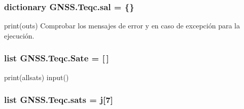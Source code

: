 \subsubsection[{sal}]{\setlength{\rightskip}{0pt plus 5cm}dictionary G\-N\-S\-S.\-Teqc.\-sal = \{\}}\label{namespaceGNSS_1_1Teqc_a0b9c69b0e28e6b6908f862f705cd1ad6}


print(outs) Comprobar los mensajes de error y en caso de excepción para la ejecución. 

\subsubsection[{Sate}]{\setlength{\rightskip}{0pt plus 5cm}list G\-N\-S\-S.\-Teqc.\-Sate = [$\,$]}\label{namespaceGNSS_1_1Teqc_a0bade0c6e842780cce100a78e33aa22f}


print(allsats) input() 

\subsubsection[{sats}]{\setlength{\rightskip}{0pt plus 5cm}list G\-N\-S\-S.\-Teqc.\-sats = {\bf j}[7]}\label{namespaceGNSS_1_1Teqc_a94ecb0c83433058a1602ab398c85910e}
